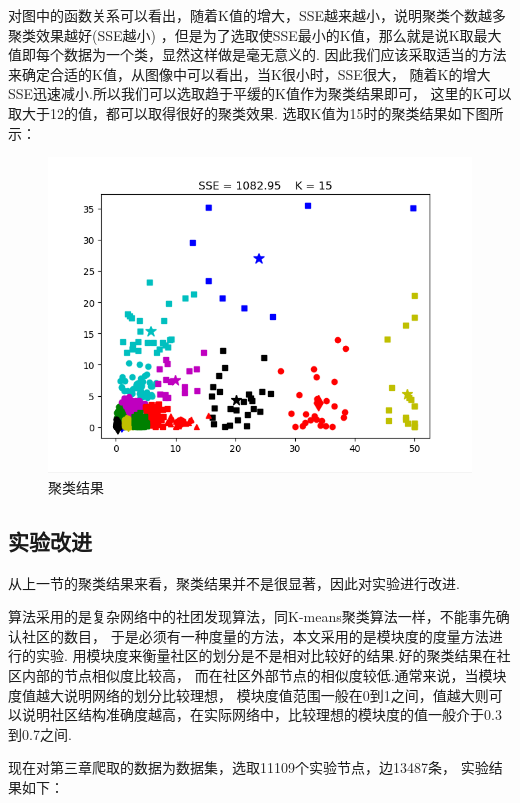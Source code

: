 \documentclass[bachelor,adobefonts]{jnuthesis}
\begin{document}
对图中的函数关系可以看出，随着K值的增大，SSE越来越小，说明聚类个数越多聚类效果越好(SSE越小)
，但是为了选取使SSE最小的K值，那么就是说K取最大值即每个数据为一个类，显然这样做是毫无意义的.
因此我们应该采取适当的方法来确定合适的K值，从图像中可以看出，当K很小时，SSE很大，
随着K的增大SSE迅速减小.所以我们可以选取趋于平缓的K值作为聚类结果即可，
这里的K可以取大于12的值，都可以取得很好的聚类效果.
选取K值为15时的聚类结果如下图所示：
\begin{figure}[h!]
  \centering
    \includegraphics[width=1.0\linewidth]{juleijiegou.png}
  \caption{聚类结果}
\end{figure}

\subsection{实验改进}
从上一节的聚类结果来看，聚类结果并不是很显著，因此对实验进行改进.

算法采用的是复杂网络中的社团发现算法，同K-means聚类算法一样，不能事先确认社区的数目，
于是必须有一种度量的方法，本文采用的是模块度的度量方法进行的实验.
用模块度来衡量社区的划分是不是相对比较好的结果.好的聚类结果在社区内部的节点相似度比较高，
而在社区外部节点的相似度较低.通常来说，当模块度值越大说明网络的划分比较理想，
模块度值范围一般在0到1之间，值越大则可以说明社区结构准确度越高，在实际网络中，比较理想的模块度的值一般介于0.3
到0.7之间.

现在对第三章爬取的数据为数据集，选取11109个实验节点，边13487条，
实验结果如下：
\end{document}
